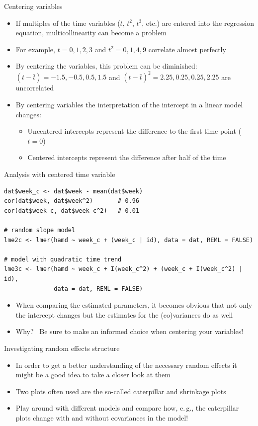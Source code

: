 \documentclass[aspectratio=169]{beamer}
\begin{document}
\begin{frame}{Centering variables}
  \begin{itemize}
    \item If multiples of the time variables ($t$, $t^2$, $t^3$, etc.) are
      entered into the regression equation, multicollinearity can become a
      problem
    \item For example, $t = 0, 1, 2, 3$ and $t^2 = 0, 1, 4, 9$ correlate almost
      perfectly
    \item By centering the variables, this problem can be diminished: $(t -
      \bar{t}) = -1.5, -0.5, 0.5,  1.5$ and $(t - \bar{t})^2 = 2.25, 0.25, 0.25,
      2.25$ are uncorrelated
    \item By centering variables the interpretation of the intercept in a linear
      model changes:
  \begin{itemize}
    \item Uncentered intercepts represent the difference to the first time 
    point ($t = 0$)
    \item Centered intercepts represent the difference after half of the 
    time
  \end{itemize}
  \end{itemize}
\end{frame}

\begin{frame}[fragile]{Analysis with centered time variable}
\begin{lstlisting}
dat$week_c <- dat$week - mean(dat$week)
cor(dat$week, dat$week^2)       # 0.96
cor(dat$week_c, dat$week_c^2)   # 0.01

# random slope model
lme2c <- lmer(hamd ~ week_c + (week_c | id), data = dat, REML = FALSE)

# model with quadratic time trend
lme3c <- lmer(hamd ~ week_c + I(week_c^2) + (week_c + I(week_c^2) | id),
              data = dat, REML = FALSE)
\end{lstlisting}
  \begin{itemize}
    \item When comparing the estimated parameters, it becomes obvious that not
      only the intercept changes but the estimates for the (co)variances do as
      well
    \item Why?\pause
      ~Be sure to make an informed choice when centering your
      variables!
  \end{itemize}
  \nocite{Alday2025}
\end{frame}

\begin{frame}[fragile]{Investigating random effects structure}
  \begin{itemize}
    \item In order to get a better understanding of the necessary random effects
      it might be a good idea to take a closer look at them
    \item Two plots often used are the so-called caterpillar and shrinkage plots
    \item Play around with different models and compare how, e.\,g., the
      caterpillar plots change with and without covariances in the model!
  \end{itemize}
\end{frame}
\end{document}
